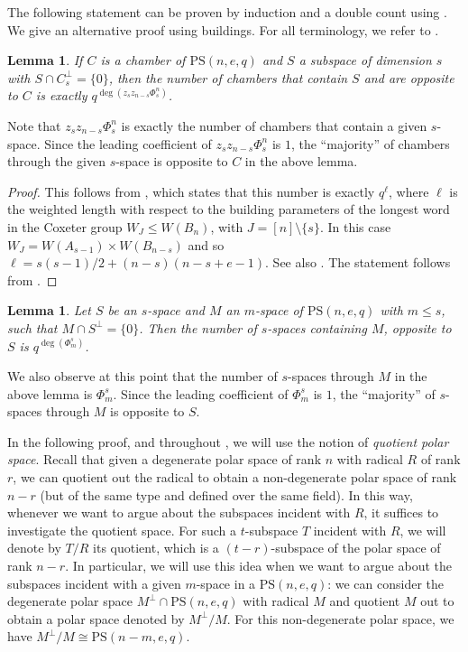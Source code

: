 \documentclass[11pt]{article}
\newtheorem{lemma}[thm]{Lemma}
\newcommand{\PS}{\mathrm{PS}}
\renewcommand{\leq}{\leqslant}
\begin{document}
The following statement can be proven by induction and a double count using . We give an alternative proof using buildings. For all terminology, we refer to \cite{AlgebraicApproach}.

\begin{lemma} \label{L: basicnumbers}
If $C$ is a chamber of $\PS(n,e,q)$ and $S$ a subspace of dimension $s$ with $S\cap C_s^\perp =\{0\}$, then the number of chambers that contain $S$ and are opposite to $C$ is exactly $q^{\deg(z_sz_{n-s}\Phi_s^n)}$.
\end{lemma}

Note that $z_sz_{n-s}\Phi_s^n$ is exactly the number of chambers that contain a given $s$-space. Since the leading coefficient of $z_sz_{n-s}\Phi_s^n$ is $1$, the ``majority'' of chambers through the given $s$-space is opposite to $C$ in the above lemma.

\begin{proof}
This follows from \cite[Corollary 3.2]{brouwer_eigenvalues}, which states that this number is exactly $q^{\ell}$, where $\ell$ is the weighted length with respect to the building parameters of the longest word in the Coxeter group $W_J \leq W(B_n)$, with $J = [n] \setminus \{s\}$. In this case $W_J = W(A_{s-1}) \times W(B_{n-s})$ and so $\ell = s(s-1)/2+(n-s)(n-s+e-1)$. See also \cite[Remark 2.19]{AlgebraicApproach}. The statement follows from .
\end{proof}



\begin{lemma}\label{L: heavy power m-space}
    Let $S$ be an $s$-space and $M$ an $m$-space of $\PS(n,e,q)$ with $m \leq s$, such that $M\cap S^\perp=\{0\}$. Then the number of $s$-spaces containing $M$, opposite to $S$ is 
    $q^{\deg(\Phi_m^s)}$.
\end{lemma}

We also observe at this point that the number of $s$-spaces through $M$ in the above lemma is $\Phi_m^s$. Since the leading coefficient of $\Phi_m^s$ is $1$, the ``majority'' of $s$-spaces through $M$ is opposite to $S$.



In the following proof, and throughout , we will use the notion of \textit{quotient polar space}. Recall that given a degenerate polar space of rank $n$ with radical $R$ of rank $r$, we can quotient out the radical to obtain a non-degenerate polar space of rank $n-r$ (but of the same type and defined over the same field). In this way, whenever we want to argue about the subspaces incident with $R$, it suffices to investigate the quotient space. For such a $t$-subspace $T$ incident with $R$, we will denote by $T/R$ its quotient, which is a $(t-r)$-subspace of the polar space of rank $n-r$. In particular, we will use this idea when we want to argue about the subspaces incident with a given $m$-space in a $\PS(n,e,q)$: we can consider the degenerate polar space $M^\perp \cap \PS(n,e,q)$ with radical $M$ and quotient $M$ out to obtain a polar space denoted by $M^\perp/M$. For this non-degenerate polar space, we have $M^\perp /M \cong\PS(n-m,e,q)$. 
\end{document}
